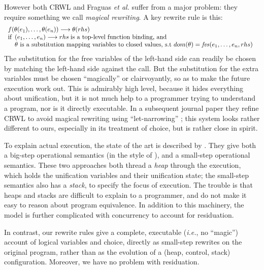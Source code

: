 \documentclass[acmsmall,review,dvipsnames]{acmart}
\newcommand{\ie}{\emph{i.e.}}	%
\newcommand{\etal}{\emph{et al.}}
\newcommand{\movesto}{\longrightarrow}
\begin{document}
However both CRWL and Fraguas {\etal} suffer from a major problem:
they require something we call \emph{magical rewriting}. A key rewrite rule is this:
$$
\begin{array}{l}
f( \theta(e_1),\ldots, \theta(e_n) ) \movesto \theta( rhs ) \\
\text{if}
\begin{array}[t]{l}
  (e_1, \ldots, e_n) \movesto rhs
   \; \text{is a top-level function binding, and} \\
\text{$\theta$ is a substitution mapping variables to closed values, s.t
$dom(\theta) = \mathit{fvs}(e_1, \ldots, e_n, rhs)$}
\end{array}
\end{array}
$$
The substitution for the free variables of the left-hand side can
readily be chosen by matching the left-hand side against the call.
But the substitution for the extra variables must be chosen ``magically''
\cite[Section 7]{fraguas:rewriting} or clairvoyantly, so as to make the future execution
work out. This is admirably high level, because it hides everything
about unification, but it is not much help to a programmer trying to
understand a program, nor is it directly executable.
In a subsequent journal paper they refine CRWL to avoid magical rewriting using
``let-narrowing'' \cite[Section 6]{fraguas:let-narrowing}; this system
looks rather different to ours, especially in its treatment of choice,
but is rather close in spirit.

To explain actual execution, the state of the art is described by
\citet{hanus:semantics}.  They give both a big-step operational
semantics (in the style of \citep{launchbury:natural}), and
a small-step operational semantics.  These two approaches both thread a
\emph{heap} through the execution, which holds the unification variables and their unification
state; the small-step semantics also has a \emph{stack}, to specify
the focus of execution.
%
The trouble is that heaps and stacks are difficult to explain to a programmer,
and do not make it easy to reason about program equivalence.
%
In addition to this machinery, the model is further complicated with
concurrency to account for residuation.

In contrast, our rewrite rules give a complete, executable ({\ie}, no ``magic'')
account of logical variables and choice, directly as small-step
rewrites on the original program, rather than as the evolution of a
(heap, control, stack) configuration. Moreover, we have no problem with
residuation.
\end{document}
